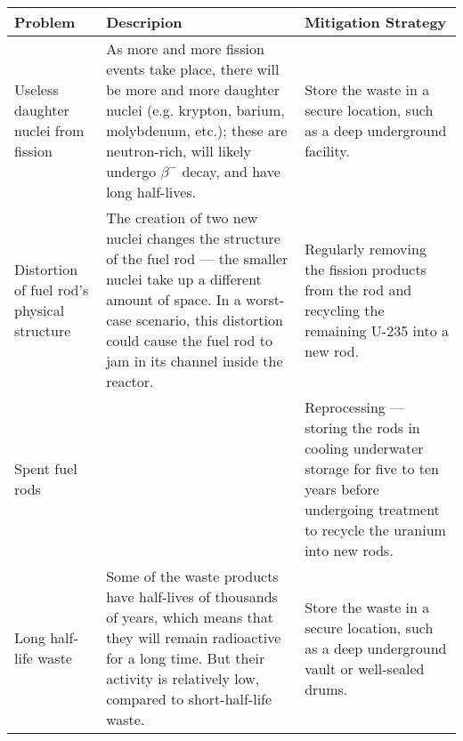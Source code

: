 \documentclass[a4paper,12pt]{article}
\begin{document}
\begin{longtable}{|p{}|p{}|p{}|}\hline
  \rowcolor{TealBlue!100!black!20} Problem                                                                     & Descripion                                                                                                                                                                                                               & Mitigation Strategy                                                                                                                                     \\ \hline
  Useless daughter nuclei from fission                                                                         & As more and more fission events take place, there will be more and more daughter nuclei (e.g. krypton, barium, molybdenum, etc.); these are neutron-rich, will likely undergo $\beta^-$ decay, and have long half-lives. & Store the waste in a secure location, such as a deep underground facility.                                                                              \\ \hline
  Distortion of fuel rod's physical structure                                                                  & The creation of two new nuclei changes the structure of the fuel rod --- the smaller nuclei take up a different amount of space.
  In a worst-case scenario, this distortion could cause the fuel rod to jam in its channel inside the reactor. & Regularly removing the fission products from the rod and recycling the remaining U-235 into a new rod.                                                                                                                                                                                                                                                                             \\ \hline
  Spent fuel rods                                                                                              &                                                                                                                                                                                                                          & Reprocessing --- storing the rods in cooling underwater storage for five to ten years before undergoing treatment to recycle the uranium into new rods. \\ \hline
  Long half-life waste                                                                                         & Some of the waste products have half-lives of thousands of years, which means that they will remain radioactive for a long time. But their activity is relatively low, compared to short-half-life waste.                & Store the waste in a secure location, such as a deep underground vault or well-sealed drums.                                                            \\ \hline

\end{longtable}
\end{document}

